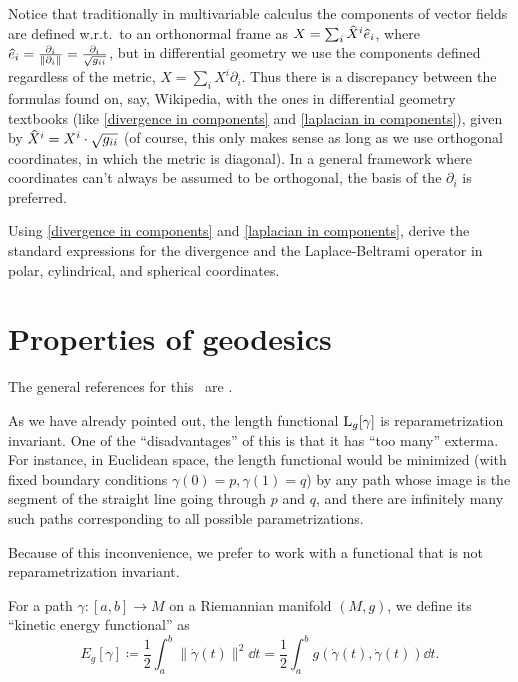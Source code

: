 \begin{rem}
    Notice that traditionally in multivariable calculus the components of vector fields are defined w.r.t.\ to an orthonormal frame as $X=\sum_i \wh{X}^i \wh{e}_i$, where $\wh{e}_i=\frac{\partial_i}{\lVert \partial_i\lVert}=\frac{\partial_i}{\sqrt{g_{ii}}}$, but in differential geometry we use the components defined regardless of the metric, $X=\sum_i X^i \partial_i$. Thus there is a discrepancy between the formulas found on, say, Wikipedia, with the ones in differential geometry textbooks (like \eqref{divergence in components} and \eqref{laplacian in components}), given by $\wh{X}^i=X^i\cdot \sqrt{g_{ii}}$ (of course, this only makes sense as long as we use orthogonal coordinates, in which the metric is diagonal). In a general framework where coordinates can't always be assumed to be orthogonal, the basis of the $\partial_i$ is preferred.
\end{rem}

\begin{xca}
    Using \eqref{divergence in components} and \eqref{laplacian in components}, derive the standard expressions for the divergence and the Laplace-Beltrami operator in polar, cylindrical, and spherical  coordinates. 
\end{xca}




\section{Properties of geodesics}


The general references for this \sect\ are \cite{Jost,Milnor}.

As we have already pointed out, the length functional $\mathrm{L}_g[\gamma]$ is reparametrization invariant. One of the ``disadvantages'' of this is that it has ``too many'' exterma. For instance, in Euclidean space, the length functional would be minimized (with fixed boundary conditions $\gamma(0)=p,\gamma(1)=q$) by any path whose image is the segment of the straight line going through $p$ and $q$, and there are infinitely many such paths corresponding to all possible parametrizations.

Because of this inconvenience, we prefer to work with a functional that is not reparametrization invariant.

\begin{defn}
    For a path $\gamma:[a,b]\to M$ on a Riemannian manifold $(M,g)$, we define its ``kinetic energy functional'' as
    \[E_g[\gamma]\coloneqq \frac12 \int_a^b \lVert \dot\gamma(t)\rVert^2\dd t=\frac12 \int_a^b g(\dot\gamma(t),\dot\gamma(t))\dd t.\]
\end{defn}

